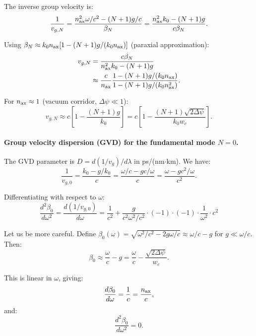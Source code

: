\documentclass[aps,prd,twocolumn,superscriptaddress,nofootinbib]{revtex4-2}
\begin{document}
The inverse group velocity is:
\begin{equation}
\frac{1}{v_{g,N}} = \frac{n_{\rm ax}^2\omega/c^2 - (N+1)g/c}{\beta_N}
= \frac{n_{\rm ax}^2 k_0 - (N+1)g}{c\beta_N}.
\end{equation}

Using $\beta_N \approx k_0 n_{\rm ax}[1 - (N+1)g/(k_0 n_{\rm ax})]$
(paraxial approximation):
\begin{align}
v_{g,N}
&= \frac{c\beta_N}{n_{\rm ax}^2 k_0 - (N+1)g} \notag\\
&\approx \frac{c}{n_{\rm ax}}
\frac{1 - (N+1)g/(k_0 n_{\rm ax})}
{1 - (N+1)g/(k_0 n_{\rm ax}^2)}. \label{eq:vg-exact}
\end{align}

For $n_{\rm ax} \approx 1$ (vacuum corridor, $\Delta\psi \ll 1$):
\begin{equation}
\boxed{
v_{g,N} \approx c\left[1 - \frac{(N+1)g}{k_0}\right]
= c\left[1 - \frac{(N+1)\sqrt{2\Delta\psi}}{k_0 w_c}\right].
}
\label{eq:vg-approx}
\end{equation}

\paragraph{Group velocity dispersion (GVD) for the fundamental mode $N=0$.}
The GVD parameter is $D = d(1/v_g)/d\lambda$ in ps/(nm$\cdot$km).  We have:
\begin{equation}
\frac{1}{v_{g,0}} = \frac{k_0 - g/k_0}{c}
= \frac{\omega/c - g c/\omega}{c}
= \frac{\omega - gc^2/\omega}{c^2}.
\end{equation}

Differentiating with respect to $\omega$:
\begin{equation}
\frac{d^2\beta_0}{d\omega^2}
= \frac{d(1/v_{g,0})}{d\omega}
= \frac{1}{c^2} + \frac{g}{c^2\omega^2/c^2}
\cdot(-1)\cdot(-1)
\cdot\frac{1}{\omega^2}\cdot c^2
\end{equation}

Let us be more careful.  Define $\beta_0(\omega) = \sqrt{\omega^2/c^2 - 2g\omega/c}
\approx \omega/c - g$ for $g \ll \omega/c$.  Then:
\begin{equation}
\beta_0 \approx \frac{\omega}{c} - g = \frac{\omega}{c}
- \frac{\sqrt{2\Delta\psi}}{w_c}.
\end{equation}

This is linear in $\omega$, giving:
\begin{equation}
\frac{d\beta_0}{d\omega} = \frac{1}{c} = \frac{n_{\rm ax}}{c},
\end{equation}
and:
\begin{equation}
\frac{d^2\beta_0}{d\omega^2} = 0.
\label{eq:beta2-zero}
\end{equation}
\end{document}
